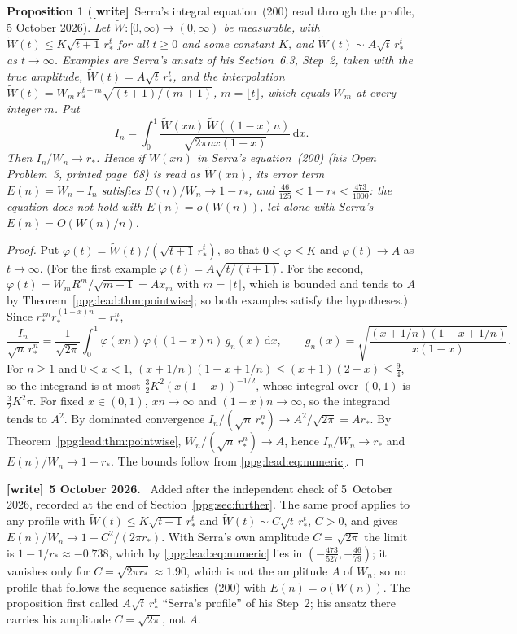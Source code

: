 \documentclass[11pt,letterpaper]{article}
\newtheorem{proposition}[theorem]{Proposition}
\theoremstyle{remark}\newtheorem{remark}[theorem]{Remark}
\numberwithin{equation}{section}
\newcommand{\dd}{\mathrm d}
\newenvironment{writenote}[1][]{\par\smallskip\begingroup\small
 \noindent\textbf{[write]}\if\relax\detokenize{#1}\relax\else~\textbf{#1.}\fi\ }%
 {\par\endgroup\smallskip}
\newcommand{\wtag}{\textup{\textbf{[write]}}}
\begin{document}
\begin{proposition}[\wtag\ Serra's integral equation~(200) read through the profile, 5 October 2026]\label{ppg:lead:prop:op3}
Let $\widetilde W:[0,\infty)\to(0,\infty)$ be measurable, with $\widetilde W(t)\le K\sqrt{t+1}\,r_*^t$ for all $t\ge0$ and some constant $K$, and $\widetilde W(t)\sim A\sqrt t\,r_*^t$ as $t\to\infty$. Examples are Serra's ansatz of his Section~6.3, Step~2, taken with the true amplitude, $\widetilde W(t)=A\sqrt t\,r_*^t$, and the interpolation $\widetilde W(t)=W_m\,r_*^{t-m}\sqrt{(t+1)/(m+1)}$, $m=\lfloor t\rfloor$, which equals $W_m$ at every integer $m$. Put
\[
 I_n=\int_0^1\frac{\widetilde W(xn)\,\widetilde W((1-x)n)}{\sqrt{2\pi nx(1-x)}}\,\dd x .
\]
Then $I_n/W_n\to r_*$. Hence if $W(xn)$ in Serra's equation~(200) (his Open Problem~3, printed page~68) is read as $\widetilde W(xn)$, its error term $E(n)=W_n-I_n$ satisfies $E(n)/W_n\to1-r_*$, and $\frac{46}{125}<1-r_*<\frac{473}{1000}$: the equation does not hold with $E(n)=o(W(n))$, let alone with Serra's $E(n)=O(W(n)/n)$.
\end{proposition}
\begin{proof}
Put $\varphi(t)=\widetilde W(t)/(\sqrt{t+1}\,r_*^t)$, so that $0<\varphi\le K$ and $\varphi(t)\to A$ as $t\to\infty$. (For the first example $\varphi(t)=A\sqrt{t/(t+1)}$. For the second, $\varphi(t)=W_mR^m/\sqrt{m+1}=Ax_m$ with $m=\lfloor t\rfloor$, which is bounded and tends to $A$ by Theorem~\ref{ppg:lead:thm:pointwise}; so both examples satisfy the hypotheses.) Since $r_*^{xn}r_*^{(1-x)n}=r_*^n$,
\[
 \frac{I_n}{\sqrt n\,r_*^n}
 =\frac1{\sqrt{2\pi}}\int_0^1\varphi(xn)\,\varphi((1-x)n)\,g_n(x)\,\dd x,
 \qquad g_n(x)=\sqrt{\frac{(x+1/n)(1-x+1/n)}{x(1-x)}} .
\]
For $n\ge1$ and $0<x<1$, $(x+1/n)(1-x+1/n)\le(x+1)(2-x)\le\frac94$, so the integrand is at most $\frac32K^2(x(1-x))^{-1/2}$, whose integral over $(0,1)$ is $\frac32K^2\pi$. For fixed $x\in(0,1)$, $xn\to\infty$ and $(1-x)n\to\infty$, so the integrand tends to $A^2$. By dominated convergence $I_n/(\sqrt n\,r_*^n)\to A^2/\sqrt{2\pi}=Ar_*$. By Theorem~\ref{ppg:lead:thm:pointwise}, $W_n/(\sqrt n\,r_*^n)\to A$, hence $I_n/W_n\to r_*$ and $E(n)/W_n\to1-r_*$. The bounds follow from \eqref{ppg:lead:eq:numeric}.
\end{proof}
\begin{writenote}[5 October 2026]
Added after the independent check of 5~October 2026, recorded at the end of Section~\ref{ppg:sec:further}. The same proof applies to any profile with $\widetilde W(t)\le K\sqrt{t+1}\,r_*^t$ and $\widetilde W(t)\sim C\sqrt t\,r_*^t$, $C>0$, and gives $E(n)/W_n\to1-C^2/(2\pi r_*)$. With Serra's own amplitude $C=\sqrt{2\pi}$ the limit is $1-1/r_*\approx-0.738$, which by \eqref{ppg:lead:eq:numeric} lies in $(-\frac{473}{527},-\frac{46}{79})$; it vanishes only for $C=\sqrt{2\pi r_*}\approx1.90$, which is not the amplitude $A$ of $W_n$, so no profile that follows the sequence satisfies~(200) with $E(n)=o(W(n))$. The proposition first called $A\sqrt t\,r_*^t$ ``Serra's profile'' of his Step~2; his ansatz there carries his amplitude $C=\sqrt{2\pi}$, not $A$.
\end{writenote}
\end{document}
